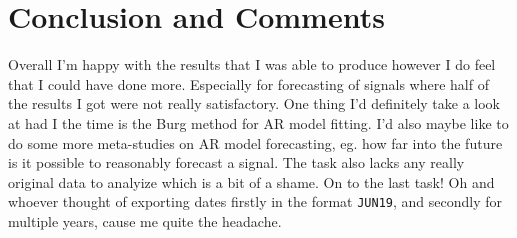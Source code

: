 \documentclass[10pt, titlepage, a4paper]{article}
\begin{document}
\section{Conclusion and Comments}
Overall I'm happy with the results that I was able to produce however I do feel that I could have done more. Especially 
for forecasting of signals where half of the results I got were not really satisfactory. One thing I'd definitely take a look 
at had I the time is the Burg method for AR model fitting. I'd also maybe like to do some more meta-studies on AR model forecasting, eg.
how far into the future is it possible to reasonably forecast a signal. The task also lacks any really original data to 
analyize which is a bit of a shame. On to the last task! Oh and whoever thought of exporting dates firstly in the format
\texttt{JUN19}, and secondly for multiple years, cause me quite the headache.

% 
% 

\end{document}

